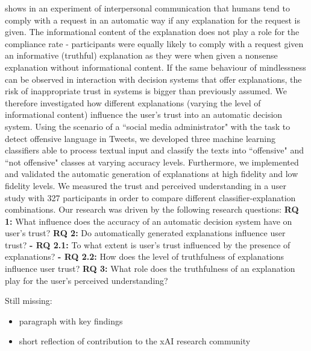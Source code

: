 \cite{langer1978mindlessness} shows in an experiment of interpersonal communication that humans tend to comply with a request in an automatic way if any explanation for the request is given. The informational content of the explanation does not play a role for the compliance rate - participants were equally likely to comply with a request given an informative (truthful) explanation as they were when given a nonsense explanation without informational content. If the same behaviour of mindlessness can be observed in interaction with decision systems that offer explanations, the risk of inappropriate trust in systems is bigger than previously assumed.\medskip \newline
We therefore investigated how different explanations (varying the level of informational content) influence the user's trust into an automatic decision system. Using the scenario of a ``social media administrator" with the task to detect offensive language in Tweets, we developed three machine learning classifiers able to process textual input and classify the texts into ``offensive" and ``not offensive" classes at varying accuracy levels. Furthermore, we implemented and validated the automatic generation of explanations at high fidelity and low fidelity levels. We measured the trust and perceived understanding in a user study with 327 participants in order to compare different classifier-explanation combinations. Our research was driven by the following research questions:\medskip \newline
\textbf{RQ 1:} What influence does the accuracy of an automatic decision system have on user's trust?\medskip \newline
\textbf{RQ 2:} Do automatically generated explanations influence user trust?\newline
\textbf{- RQ 2.1:} To what extent is user's trust influenced by the presence of explanations?\newline
\textbf{- RQ 2.2:} How does the level of truthfulness of explanations influence user trust?\medskip \newline
\textbf{RQ 3:} What role does the truthfulness of an explanation play for the user's perceived understanding?\medskip \newline




{\color{blue}
Still missing:
\begin{itemize}
	\item paragraph with key findings
	\item short reflection of contribution to the xAI research community 
\end{itemize}}

